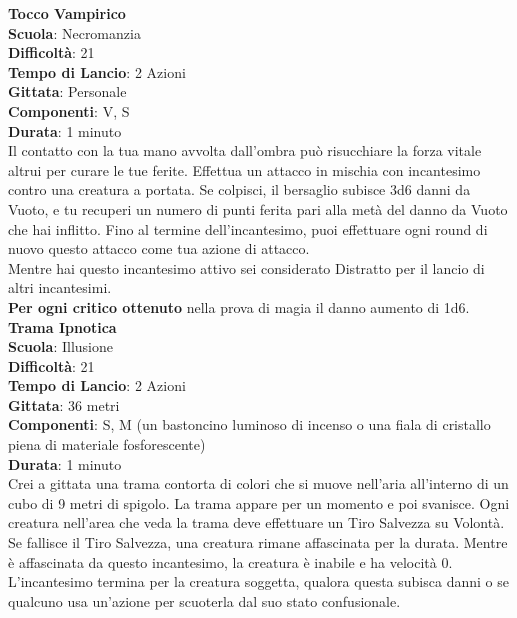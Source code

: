 \begin{multicols}{2}
\medskip\textbf{Tocco Vampirico}\\
\textbf{Scuola}: Necromanzia\\
\textbf{Difficoltà}: 21\\
\textbf{Tempo di Lancio}: 2 Azioni\\
\textbf{Gittata}: Personale\\
\textbf{Componenti}: V, S\\
\textbf{Durata}: 1 minuto \\
Il contatto con la tua mano avvolta dall'ombra può risucchiare la forza vitale altrui per curare le tue ferite. Effettua un attacco in mischia con incantesimo contro una creatura a portata. Se colpisci, il bersaglio subisce 3d6 danni da Vuoto, e tu recuperi un numero di punti ferita pari alla metà del danno da Vuoto che hai inflitto. Fino al termine dell'incantesimo, puoi effettuare ogni round di nuovo questo attacco come tua azione di attacco.\\
Mentre hai questo incantesimo attivo sei considerato Distratto per il lancio di altri incantesimi.\\
\textbf{Per ogni critico ottenuto} nella prova di magia il danno aumento di 1d6.\\

\medskip\textbf{Trama Ipnotica}\\
\textbf{Scuola}: Illusione\\
\textbf{Difficoltà}: 21\\
\textbf{Tempo di Lancio}: 2 Azioni\\
\textbf{Gittata}: 36 metri\\
\textbf{Componenti}: S, M (un bastoncino luminoso di incenso o una fiala di cristallo piena di materiale fosforescente)\\
\textbf{Durata}: 1 minuto\\
Crei a gittata una trama contorta di colori che si muove nell'aria all'interno di un cubo di 9 metri di spigolo. La trama appare per un momento e poi svanisce. Ogni creatura nell'area che veda la trama deve effettuare un Tiro Salvezza su Volontà. Se fallisce il Tiro Salvezza, una creatura rimane affascinata per la durata. Mentre è affascinata da questo incantesimo, la creatura è inabile e ha velocità 0. L'incantesimo termina per la creatura soggetta, qualora questa subisca danni o se qualcuno usa un'azione per scuoterla dal suo stato confusionale.


\end{multicols}
